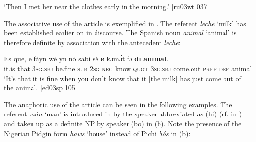 \glt ‘Then I met her near the clothes early in the morning.’ [ru03wt 037]
\z

The associative use of the article is exemplified in . The referent \textit{leche} ‘milk’ has been established earlier on in discourse. The Spanish noun \textit{animal} ‘animal’ is therefore definite by association with the antecedent \textit{leche}:


\ea%
    \label{ex:key:171}
    \gll Es  que,    e    fáyn    wé  yu  nó  sabí    sé 
\textbf{e}    kɔmɔ́t    fɔ  \textbf{di} \textbf{animal}.\\
it.is  that    \textsc{3sg.sbj}  be.fine  \textsc{sub}  \textsc{2sg}  \textsc{neg}  know  \textsc{quot} 
\textsc{3sg.sbj}  come.out  \textsc{prep}  \textsc{def}  animal\\

\glt ‘It’s that it is fine when you don’t know that it [the milk] has just come out of the animal. [ed03sp 105]
\z

The anaphoric use of the article can be seen in the following examples. The referent \textit{mán} ‘man’ is introduced in  by the speaker abbreviated as (hi) (cf.  in ) and taken up as a definite NP by speaker (bo) in (b). Note the presence of the Nigerian Pidgin form \textit{haws} ‘house’ instead of Pichi \textit{hós} in (b):


\ea%
    \label{ex:key:172}

\z
\z




